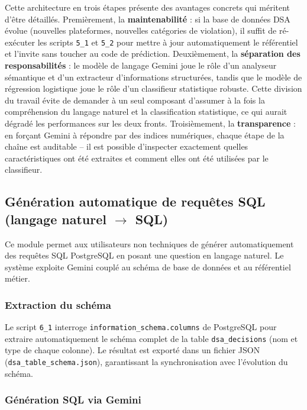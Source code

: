 \documentclass[10pt,twocolumn,a4paper]{article}
\begin{document}
Cette architecture en trois étapes présente des avantages concrets qui méritent d'être détaillés. Premièrement, la \textbf{maintenabilité} : si la base de données DSA évolue (nouvelles plateformes, nouvelles catégories de violation), il suffit de ré-exécuter les scripts \texttt{5\_1} et \texttt{5\_2} pour mettre à jour automatiquement le référentiel et l'invite sans toucher au code de prédiction. Deuxièmement, la \textbf{séparation des responsabilités} : le modèle de langage Gemini joue le rôle d'un analyseur sémantique et d'un extracteur d'informations structurées, tandis que le modèle de régression logistique joue le rôle d'un classifieur statistique robuste. Cette division du travail évite de demander à un seul composant d'assumer à la fois la compréhension du langage naturel et la classification statistique, ce qui aurait dégradé les performances sur les deux fronts. Troisièmement, la \textbf{transparence} : en forçant Gemini à répondre par des indices numériques, chaque étape de la chaîne est auditable -- il est possible d'inspecter exactement quelles caractéristiques ont été extraites et comment elles ont été utilisées par le classifieur.

\subsection{Génération automatique de requêtes SQL (langage naturel $\rightarrow$ SQL)}

Ce module permet aux utilisateurs non techniques de générer automatiquement des requêtes SQL PostgreSQL en posant une question en langage naturel. Le système exploite Gemini couplé au schéma de base de données et au référentiel métier.

\subsubsection{Extraction du schéma}

Le script \texttt{6\_1} interroge \texttt{information\_schema.columns} de PostgreSQL pour extraire automatiquement le schéma complet de la table \texttt{dsa\_decisions} (nom et type de chaque colonne). Le résultat est exporté dans un fichier JSON (\texttt{dsa\_table\_schema.json}), garantissant la synchronisation avec l'évolution du schéma.

\subsubsection{Génération SQL via Gemini}
\end{document}
